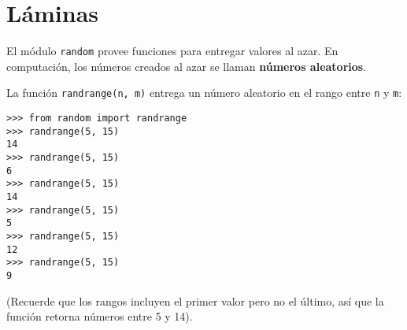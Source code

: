 \section{Láminas}

El módulo \lstinline!random! provee funciones para entregar valores al
azar. En computación, los números creados al azar se llaman
\textbf{números aleatorios}.

La función \lstinline!randrange(n, m)! entrega un número aleatorio en el
rango entre \lstinline!n! y \lstinline!m!:

\begin{lstlisting}
>>> from random import randrange
>>> randrange(5, 15)
14
>>> randrange(5, 15)
6
>>> randrange(5, 15)
14
>>> randrange(5, 15)
5
>>> randrange(5, 15)
12
>>> randrange(5, 15)
9
\end{lstlisting}

(Recuerde que los rangos incluyen el primer valor pero no el último, así
que la función retorna números entre 5 y 14).

